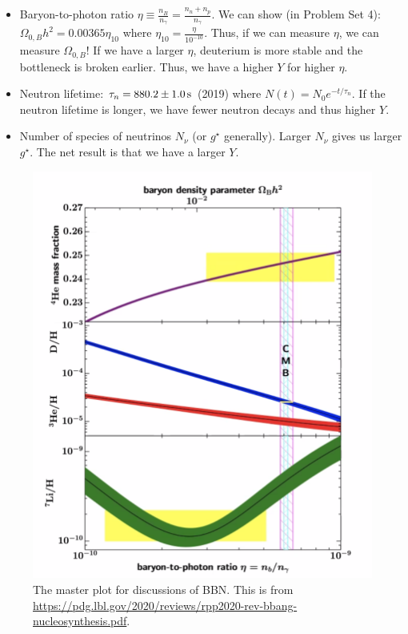 \documentclass{article}
\newcommand{\unit}[1]{{\,\rm #1}}
\newcommand{\s}{\unit{s}}
\begin{document}
\begin{itemize}
    \item Baryon-to-photon ratio $\eta \equiv \frac{n_B}{n_\gamma} = \frac{n_n + n_p}{n_\gamma}$. We can show (in Problem Set 4): $\Omega_{0,B} h^2 = 0.00365 \eta_{10}$ where $\eta_{10} = \frac{\eta}{10^{-10}}$. Thus, if we can measure $\eta$, we can measure $\Omega_{0,B}$! If we have a larger $\eta$, deuterium is more stable and the bottleneck is broken earlier. Thus, we have a higher $Y$ for higher $\eta$. 
    \item Neutron lifetime: $\tau_n = 880.2 \pm 1.0 \s$ (2019) where $N(t) = N_0 e^{-t/\tau_n}$. If the neutron lifetime is longer, we have fewer neutron decays and thus higher $Y$. 
    \item Number of species of neutrinos $N_\nu$ (or $g^\star$ generally). Larger $N_\nu$ gives us larger $g^\star$. The net result is that we have a larger $Y$.  
\end{itemize}

\begin{figure}
    \centering
    \includegraphics{Screen Shot 2021-03-10 at 11.51.46 AM.png}
    \caption{The master plot for discussions of BBN. This is from \url{https://pdg.lbl.gov/2020/reviews/rpp2020-rev-bbang-nucleosynthesis.pdf}. }
    \label{fig:lablablab}
\end{figure}
\end{document}
